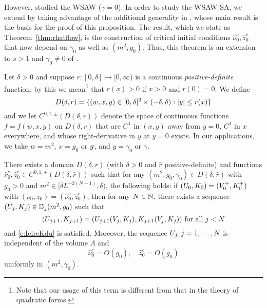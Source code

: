 However, \cite{BBS-saw4-log} studied the WSAW ($\gamma = 0$). In order to study
the WSAW-SA, we extend \cite[Proposition~\ref{log-prop:flow-flow}]{BBS-saw4-log}
by taking advantage of the additional generality in \cite{BBS-rg-flow}, whose
main result is the basis for the proof of this proposition. The result, which we
state as Theorem~\ref{thm:rhatflow}, is the
construction of critical initial conditions $\hat\nu_0^c, \hat z_0^c$ that now
depend on $\gamma_0$ as well as $(m^2, g_0)$. Thus, this theorem is an extension
to $s > 1$ and $\gamma_0 \ne 0$ of \cite[Proposition~\ref{log-prop:flow-flow}]{BBS-saw4-log}.

Let $\delta > 0$ and suppose $r : [0, \delta] \to [0, \infty)$
is a continuous \emph{positive-definite} function; by this we
mean\footnote{Note that our usage of this term is
different from that in the theory of quadratic forms.}
that $r(x) > 0$ if $x > 0$ and $r(0) = 0$.
We define
\begin{equation}
\lbeq{Ddef}
D(\delta, r)
	=
\{ (w, x, y) \in [0, \delta]^2 \times (-\delta, \delta) : |y| \leq r(x) \}
\end{equation}
and we let $C^{0,1,\pm}(D(\delta, r))$ denote the space of continuous functions
$f = f(w, x, y)$ on $D(\delta, r)$
that are $C^1$ in $(x, y)$ away from $y = 0$, $C^1$ in $x$ everywhere,
and whose right-derivative in $y$ at $y = 0$ exists.
In our applications, we take $w = m^2$, $x = g_0$ or $g$,
and $y = \gamma_0$ or $\gamma$.

\begin{theorem}
\label{thm:rhatflow}
There exists a domain $D(\delta, \hat r)$ (with $\delta > 0$ and $\hat r$
positive-definite) and functions $\hat\nu_0^c, \hat z_0^c \in C^{0,1,\pm}(D(\delta, \hat r))$
such that for any $(m^2, g_0, \gamma_0) \in D(\delta, \hat r)$
with $g_0 > 0$ and $m^2 \in [\delta L^{-2 (N - 1)}, \delta)$, the following holds:
if $(U_0, K_0) = (V^+_0, K^+_0)$ with $(\nu_0, z_0) = (\hat\nu_0^c, \hat z_0^c)$,
then for any $N \in {\mathbb N}$, there exists a sequence $(U_j, K_j) \in \mathbb{D}_j(m^2, g_0)$ such that
\begin{equation}
\label{e:VjKjDj-hat}
(U_{j+1},K_{j+1})
	=
(U_{j+1}(V_j, K_j), K_{j+1}(V_j, K_j)) \text{ for all } j < N
\end{equation}
and \eqref{e:IcircKdu} is satisfied.
Moreover, the sequence $U_j, j = 1, \ldots, N$ is independent of the volume $\Lambda$ and
\begin{equation}
\label{e:hat-est}
\hat\nu_0^c = O(g_0),
\quad
\hat z_0^c = O(g_0)
\end{equation}
uniformly in $(m^2, \gamma_0)$.
\end{theorem}

